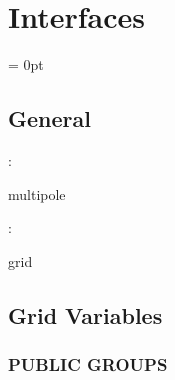 
\section{Interfaces} 


\parskip = 0pt

\vspace{3mm} \subsection*{General}

: 

multipole
\vspace{2mm}

: 

grid
\vspace{2mm}
\subsection*{Grid Variables}
\vspace{5mm}\subsubsection{PUBLIC GROUPS}

\vspace{5mm}

